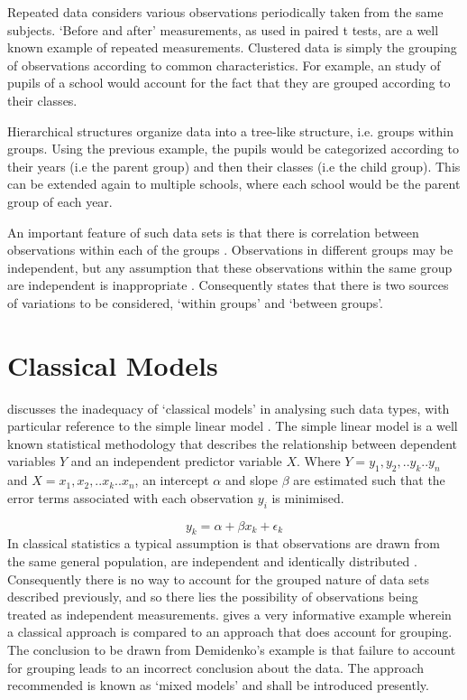 \documentclass[12pt, a4paper]{report}
\theoremstyle{plain}
\theoremstyle{definition}
\theoremstyle{remark}
\begin{document}
Repeated data considers various observations periodically taken
from the same subjects. `Before and after' measurements, as used
in paired t tests, are a well known example of repeated
measurements. Clustered data is simply the grouping of
observations according to common characteristics. For example, an
study of pupils of a school would account for the fact that they
are grouped according to their classes.

Hierarchical structures organize data into a tree-like structure,
i.e. groups within groups. Using the previous example, the pupils
would be categorized according to their years (i.e the parent
group) and then their classes (i.e the child group). This can be
extended again to multiple schools, where each school would be the
parent group of each year.

An important feature of such data sets is that there is
correlation between observations within each of the groups
\citep{Faraway}. Observations in different groups may be
independent, but any assumption that these observations within the
same group are independent is inappropriate . Consequently
\citet{Demi} states that there is two sources of variations to be
considered, `within groups' and `between groups'.


\newpage
\section{Classical Models}
\citet{Demi} discusses the inadequacy of `classical models' in
analysing such data types, with particular reference to the simple
linear model . The simple linear model is a well known statistical
methodology that describes the relationship between dependent
variables $Y$ and an independent predictor variable $X$. Where
$Y={y_{1},y_{2},..y_{k}..y_{n}}$ and
$X={x_{1},x_{2},..x_{k}..x_{n}}$, an intercept $\alpha$ and slope
$\beta$ are estimated such that the error terms associated with
each observation $y_{i}$ is minimised.

\begin{equation}
y_{k} = \alpha + \beta x_{k}+ \epsilon_{k}
\end{equation}
In classical statistics a typical assumption is that observations
are drawn from the same general population, are independent and
identically distributed \citep{Demi}. Consequently there is no way
to account for the grouped nature of data sets described
previously, and so there lies the possibility of observations
being treated as independent measurements. \citet[pg.3]{Demi}
gives a very informative example wherein a classical approach is
compared to an approach that does account for grouping. The
conclusion to be drawn from Demidenko's example is that failure to
account for grouping leads to an incorrect conclusion about the
data. The approach recommended is known as `mixed models' and
shall be introduced presently.
\end{document}
